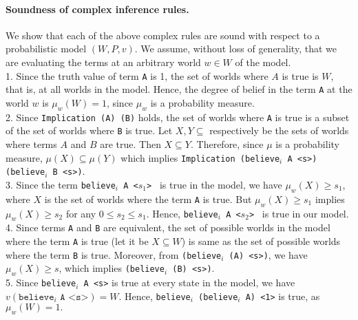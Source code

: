 \documentclass[12pt]{article}
\begin{document}
\paragraph{Soundness of complex inference rules.} We show that each of the above complex rules are sound with respect to a probabilistic model $(W,P,v)$. We assume, without loss of generality, that we are evaluating the terms at an arbitrary world $w\in W$ of the model.\\

 1. Since the truth value of term \texttt{A} is 1, the set of worlds where $A$ is true is $W$, that is, at all worlds in the model. Hence, the degree of belief in the term \texttt{A} at the world $w$ is $\mu_{w} (W) =1$, since $\mu_w$ is a probability measure.\\

2. Since \texttt{Implication (A) (B)} holds, the set of worlds where \texttt{A} is true is a subset of the set of worlds where \texttt{B} is true. Let $X,Y\subseteq$ respectively be the sets of worlds where terms $A$ and $B$ are true. Then $X\subseteq Y$. Therefore, since $\mu$ is a probability measure, $\mu(X)\subseteq \mu (Y)$ which implies \texttt{Implication (believe$_i$ A <s>) (believe$_i$ B <s>)}.\\

3. Since the term \texttt{believe$_i$ A <$s_1$> } is true in the model, we have $\mu_w(X)\geq s_1$, where $X$ is the set of worlds where the term \texttt{A} is true. But $\mu_w(X)\geq s_1$ implies $\mu_w(X)\geq s_2$ for any $0\leq s_2\leq s_1$. Hence, \texttt{believe$_i$ A <$s_2$> } is true in our model. \\

4. Since terms \texttt{A} and \texttt{B} are equivalent, the set of possible worlds in the model where the term \texttt{A} is true (let it be $X\subseteq W$) is same as the set of possible worlds where the term \texttt{B} is true. Moreover, from \texttt{(believe$_i$ (A) <s>)}, we have $\mu_w(X)\geq s$, which implies \texttt{(believe$_i$ (B) <s>)}.\\
 
5. Since \texttt{believe$_i$ A <s>} is true at every state in the model, we have $v(\texttt{believe$_i$ A <s>})=W$. Hence, \texttt{believe$_i$  (believe$_i$ A) <1>} is true, as $\mu_w(W)=1.$



\end{document}
